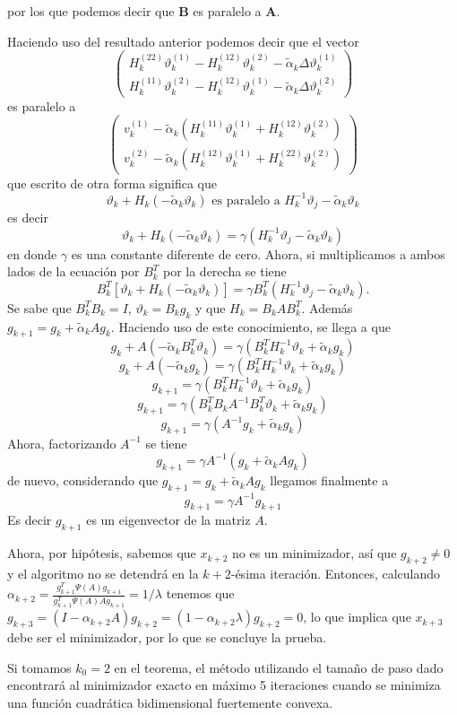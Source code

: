 por los que podemos decir que $\boldsymbol{B}$ es paralelo a $\boldsymbol{A}$.
\par Haciendo uso del resultado anterior podemos decir que el vector 
$$
\begin{pmatrix}
	H_k^{(22)}\vartheta_k^{(1)}-H_k^{(12)}\vartheta_k^{(2)}-\tilde{\alpha}_k\Delta\vartheta_k^{(1)}\\
	H_k^{(11)}\vartheta_k^{(2)}-H_k^{(12)}\vartheta_k^{(1)}-\tilde{\alpha}_k\Delta\vartheta_k^{(2)}
\end{pmatrix}
$$
es paralelo a 
$$
	\begin{pmatrix}
		v_k^{(1)} - \tilde{\alpha}_k(H_k^{(11)}\vartheta_k^{(1)}+H_k^{(12)}\vartheta_k^{(2)})\\
		v_k^{(2)} - \tilde{\alpha}_k(H_k^{(12)}\vartheta_k^{(1)}+H_k^{(22)}\vartheta_k^{(2)})
	\end{pmatrix}
$$
que escrito de otra forma significa que 
$$
\vartheta_k+H_k(-\tilde{\alpha}_k\vartheta_k) \text{ es paralelo a } H_k^{-1}\vartheta_j-\tilde{\alpha}_k\vartheta_k
$$
es decir
$$
\vartheta_k+H_k(-\tilde{\alpha}_k\vartheta_k) = \gamma(H_k^{-1}\vartheta_j-\tilde{\alpha}_k\vartheta_k)
$$
en donde $\gamma$ es una constante diferente de cero. Ahora, si multiplicamos a ambos lados de la ecuación por $B_k^T$ por la derecha se tiene
$$
B_k^T[\vartheta_k+H_k(-\tilde{\alpha}_k\vartheta_k)] = \gamma B_k^T(H_k^{-1}\vartheta_j-\tilde{\alpha}_k\vartheta_k).
$$
Se sabe que $B^T_kB_k = I$, $\vartheta_k = B_kg_k$ y que $H_k = B_kAB_k^T$. Además $g_{k+1} = g_k+\tilde{\alpha}_kAg_k$. Haciendo uso de este conocimiento, se llega a que 
$$
g_k+A(-\tilde{\alpha}_kB^T_k\vartheta_k) = \gamma(B_k^TH_k^{-1}\vartheta_k+\tilde{\alpha}_kg_k)
$$
$$
g_k+A(-\tilde{\alpha}_kg_k) = \gamma(B_k^TH_k^{-1}\vartheta_k+\tilde{\alpha}_kg_k)
$$
$$
g_{k+1} = \gamma(B_k^TH_k^{-1}\vartheta_k+\tilde{\alpha}_kg_k)
$$
$$
g_{k+1} = \gamma(B_k^TB_kA^{-1}B_k^T\vartheta_k+\tilde{\alpha}_kg_k)
$$
$$
g_{k+1} = \gamma(A^{-1}g_k+\tilde{\alpha}_kg_k)
$$
Ahora, factorizando $A^{-1}$ se tiene
$$
g_{k+1} = \gamma A^{-1}(g_k+\tilde{\alpha}_kAg_k)
$$
de nuevo, considerando que $g_{k+1} = g_k+\tilde{\alpha}_kAg_k$
llegamos finalmente a
$$
g_{k+1} = \gamma A^{-1}g_{k+1}
$$
Es decir $g_{k+1}$ es un eigenvector de la matriz $A$.
\par Ahora, por hipótesis, sabemos que $x_{k+2}$ no es un minimizador, así que $g_{k+2}\neq 0$ y el algoritmo no se detendrá en la $k+2$-ésima iteración. Entonces, calculando $\alpha_{k+2} = \frac{g_{k+1}^T\Psi(A)g_{k+1}}{g_{k+1}^T\Psi(A)Ag_{k+1}} = 1/\lambda$ tenemos que $g_{k+3} = (I-\alpha_{k+2}A)g_{k+2} = (1-\alpha_{k+2}\lambda)g_{k+2}=0$, lo que implica que $x_{k+3}$ debe ser el minimizador, por lo que se concluye la prueba.

\par Si tomamos $k_0 =2$ en el teorema, el método utilizando el tamaño de paso dado encontrará al minimizador exacto en máximo 5 iteraciones cuando se minimiza una función cuadrática bidimensional fuertemente convexa.
